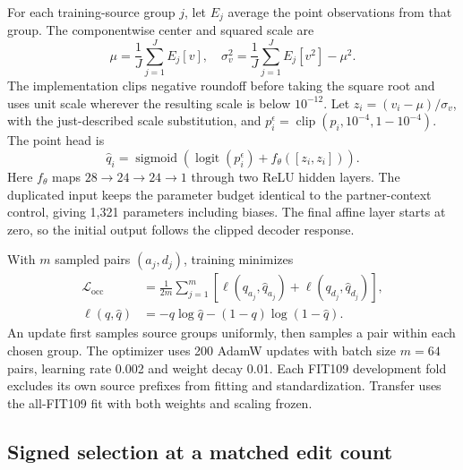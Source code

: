 \documentclass[journal]{IEEEtran}
\begin{document}
For each training-source group \(j\), let \(E_j\) average the point observations from that group. The componentwise center and squared scale are
\begin{equation}
 \mu=\frac{1}{J}\sum_{j=1}^{J}E_j[v],
 \quad \sigma_v^2=\frac{1}{J}\sum_{j=1}^{J}E_j[v^2]-\mu^2.
 \label{eq:group-standardization}
\end{equation}
The implementation clips negative roundoff before taking the square root and uses unit scale wherever the resulting scale is below \(10^{-12}\). Let \(z_i=(v_i-\mu)/\sigma_v\), with the just-described scale substitution, and \(p_i^\epsilon=\operatorname{clip}(p_i,10^{-4},1-10^{-4})\). The point head is
\begin{equation}
 \widehat q_i=\operatorname{sigmoid}\!
   \left(\operatorname{logit}(p_i^\epsilon)+f_\theta([z_i,z_i])\right).
 \label{eq:occupancy-head}
\end{equation}
Here \(f_\theta\) maps \(28\to24\to24\to1\) through two ReLU hidden layers. The duplicated input keeps the parameter budget identical to the partner-context control, giving 1,321 parameters including biases. The final affine layer starts at zero, so the initial output follows the clipped decoder response.

With \(m\) sampled pairs \((a_j,d_j)\), training minimizes
\begin{equation}
\begin{split}
 \mathcal L_{\mathrm{occ}}
   &= \frac{1}{2m}\sum_{j=1}^{m}
       \left[\ell(q_{a_j},\widehat q_{a_j})+
             \ell(q_{d_j},\widehat q_{d_j})\right],\\
 \ell(q,\hat q)&=-q\log\hat q-(1-q)\log(1-\hat q).
\end{split}
\label{eq:occ-loss}
\end{equation}
An update first samples source groups uniformly, then samples a pair within each chosen group. The optimizer uses 200 AdamW updates with batch size \(m=64\) pairs, learning rate 0.002 and weight decay 0.01. Each FIT109 development fold excludes its own source prefixes from fitting and standardization. Transfer uses the all-FIT109 fit with both weights and scaling frozen.

\subsection{Signed selection at a matched edit count}
\label{sec:selection}
\end{document}

